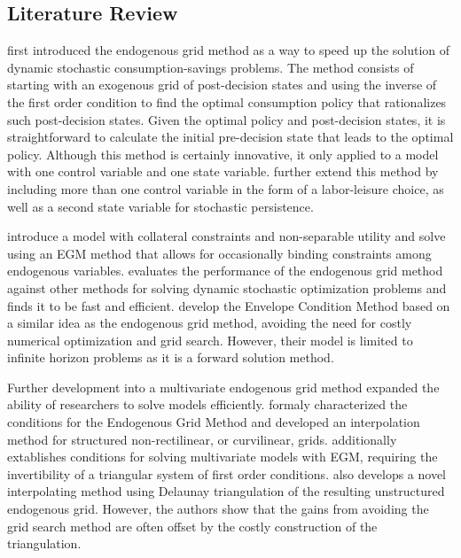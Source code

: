 \documentclass[\econtexRoot/SequentialEGM]{subfiles}
\begin{document}
\subsection{Literature Review} %


\cite{Carroll2006-wq} first introduced the endogenous grid method as a way to speed up the solution of dynamic stochastic consumption-savings problems. The method consists of starting with an exogenous grid of post-decision states and using the inverse of the first order condition to find the optimal consumption policy that rationalizes such post-decision states. Given the optimal policy and post-decision states, it is straightforward to calculate the initial pre-decision state that leads to the optimal policy. Although this method is certainly innovative, it only applied to a model with one control variable and one state variable. \cite{Barillas2007-uh} further extend this method by including more than one control variable in the form of a labor-leisure choice, as well as a second state variable for stochastic persistence.

\cite{Hintermaier2010-io} introduce a model with collateral constraints and non-separable utility and solve using an EGM method that allows for occasionally binding constraints among endogenous variables. \cite{Jorgensen2013-du} evaluates the performance of the endogenous grid method against other methods for solving dynamic stochastic optimization problems and finds it to be fast and efficient. \cite{Maliar2013-sv} develop the Envelope Condition Method based on a similar idea as the endogenous grid method, avoiding the need for costly numerical optimization and grid search. However, their model is limited to infinite horizon problems as it is a forward solution method.

Further development into a multivariate endogenous grid method expanded the ability of researchers to solve models efficiently. \cite{White2015-fg} formaly characterized the conditions for the Endogenous Grid Method and developed an interpolation method for structured non-rectilinear, or curvilinear, grids. \cite{Iskhakov2015-jy} additionally extablishes conditions for solving multivariate models with EGM, requiring the invertibility of a triangular system of first order conditions. \cite{Ludwig2018-uz} also develops a novel interpolating method using Delaunay triangulation of the resulting unstructured endogenous grid. However, the authors show that the gains from avoiding the grid search method are often offset by the costly construction of the triangulation.
\end{document}
